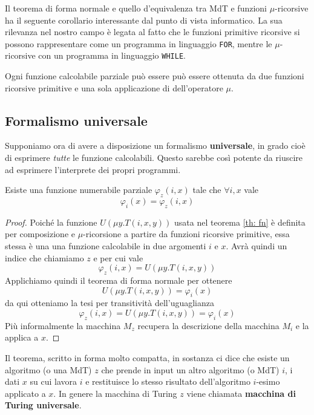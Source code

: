 Il teorema di forma normale e quello d'equivalenza tra MdT e
funzioni $\mu$-ricorsive ha il seguente corollario interessante
dal punto di vista informatico. La sua rilevanza nel nostro
campo è legata al fatto che le funzioni primitive ricorsive
si possono rappresentare come un programma in linguaggio
\verb|FOR|, mentre le $\mu$-ricorsive con un programma in
linguaggio \verb|WHILE|.

\begin{corollary}
	Ogni funzione calcolabile parziale può essere può essere
	ottenuta da due funzioni ricorsive primitive e una sola
	applicazione di dell'operatore $\mu$.
\end{corollary}

\subsection{Formalismo universale}
Supponiamo ora di avere a disposizione un formalismo
\textbf{universale}, in grado cioè di esprimere \emph{tutte}
le funzione calcolabili. Questo sarebbe così potente da
riuscire ad esprimere l'interprete dei propri programmi.

\begin{theorem}[Enumerazione]
	Esiste una funzione numerabile parziale $\varphi_z(i, x)$
	tale che $\forall i,x$ vale
	\[ \varphi_i(x) = \varphi_z (i, x) \]
	\begin{proof}
		Poiché la funzione $U(\mu y . T(i, x, y))$ usata nel
		teorema \ref{th: fn} è definita per composizione e
		$\mu$-ricorsione a partire da funzioni ricorsive
		primitive, essa stessa è una una funzione calcolabile
		in due argomenti $i$ e $x$. Avrà quindi un indice che
		chiamiamo $z$ e per cui vale
		\[ \varphi_z (i, x) = U(\mu y. T(i, x, y)) \]
		Applichiamo quindi il teorema di forma normale per
		ottenere
		\[ U(\mu y . T(i, x, y)) = \varphi_i (x) \]
		da qui otteniamo la tesi per transitività
		dell'uguaglianza
		\[
			\varphi_z (i, x) = U(\mu y . T(i, x, y)) =
			\varphi_i (x)
		\]
		Più informalmente la macchina $M_z$ recupera la
		descrizione della macchina $M_i$ e la applica a $x$.
	\end{proof}
\end{theorem}

Il teorema, scritto in forma molto compatta, in sostanza ci
dice che esiste un algoritmo (o una MdT) $z$ che prende in
input un altro algoritmo (o MdT) $i$, i dati $x$ su cui lavora
$i$ e restituisce lo stesso risultato dell'algoritmo $i$-esimo
applicato a $x$. In genere la macchina di Turing $z$ viene
chiamata \textbf{macchina di Turing universale}.

